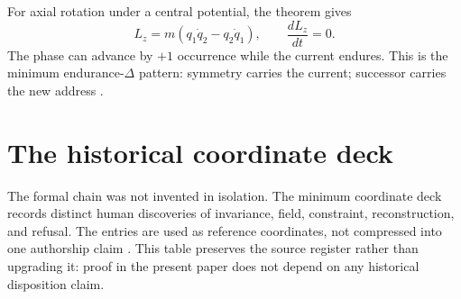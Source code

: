 \documentclass[11pt]{article}
\begin{document}
For axial rotation under a central potential, the theorem gives
\[
L_z=m(q_1\dot q_2-q_2\dot q_1),
\qquad
\frac{dL_z}{dt}=0.
\]
The phase can advance by $+1$ occurrence while the current endures. This is the minimum endurance-$\Delta$ pattern: symmetry carries the current; successor carries the new address \cite{CoppaMinimumEndurance2026}.

\section{The historical coordinate deck}

The formal chain was not invented in isolation. The minimum coordinate deck records distinct human discoveries of invariance, field, constraint, reconstruction, and refusal. The entries are used as reference coordinates, not compressed into one authorship claim \cite{CoppaCoordinateRegister2026}. This table preserves the source register rather than upgrading it: proof in the present paper does not depend on any historical disposition claim.
\end{document}
